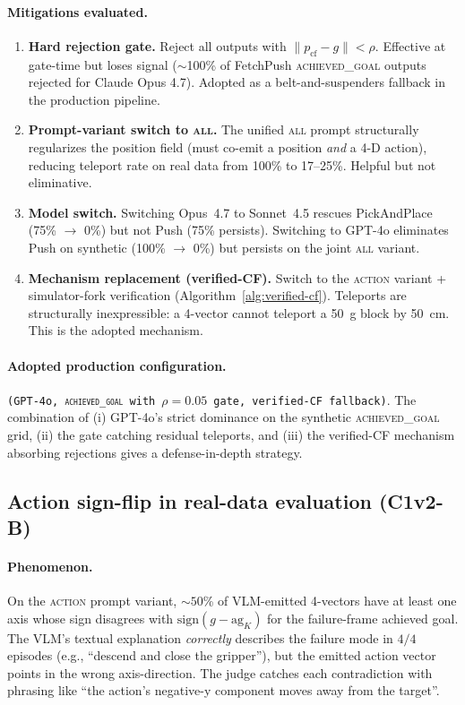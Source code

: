 \paragraph{Mitigations evaluated.}
\begin{enumerate}\itemsep0pt
\item \textbf{Hard rejection gate.} Reject all outputs with
$\|p_{\text{cf}}-g\|<\rho$. Effective at gate-time but loses signal
($\sim$100\% of FetchPush \textsc{achieved\_goal} outputs rejected for
Claude Opus 4.7). Adopted as a belt-and-suspenders fallback in the
production pipeline.
\item \textbf{Prompt-variant switch to \textsc{all}.} The unified
\textsc{all} prompt structurally regularizes the position field (must
co-emit a position \emph{and} a 4-D action), reducing teleport rate
on real data from 100\% to 17--25\%. Helpful but not eliminative.
\item \textbf{Model switch.} Switching Opus~4.7 to Sonnet~4.5
rescues PickAndPlace (75\% $\to$ 0\%) but not Push (75\% persists).
Switching to GPT-4o eliminates Push on synthetic (100\% $\to$ 0\%)
but persists on the joint \textsc{all} variant.
\item \textbf{Mechanism replacement (verified-CF).} Switch to the
\textsc{action} variant + simulator-fork verification
(Algorithm~\ref{alg:verified-cf}). Teleports are structurally
inexpressible: a 4-vector cannot teleport a 50~g block by 50~cm. This is
the adopted mechanism.
\end{enumerate}

\paragraph{Adopted production configuration.}
\texttt{(GPT-4o, \textsc{achieved\_goal} with $\rho\!=\!0.05$ gate,
verified-CF fallback)}. The combination of (i) GPT-4o's strict
dominance on the synthetic \textsc{achieved\_goal} grid, (ii) the gate
catching residual teleports, and (iii) the verified-CF mechanism
absorbing rejections gives a defense-in-depth strategy.

\subsection{Action sign-flip in real-data evaluation (C1v2-B)}
\label{app:sign-flip}

\paragraph{Phenomenon.}
On the \textsc{action} prompt variant, $\sim\!50$\% of VLM-emitted
4-vectors have at least one axis whose sign disagrees with
$\mathrm{sign}(g - \text{ag}_K)$ for the failure-frame achieved goal.
The VLM's textual explanation \emph{correctly} describes the failure
mode in $4/4$ episodes (e.g., ``descend and close the gripper''), but
the emitted action vector points in the wrong axis-direction. The judge
catches each contradiction with phrasing like ``the action's negative-y
component moves away from the target''.

